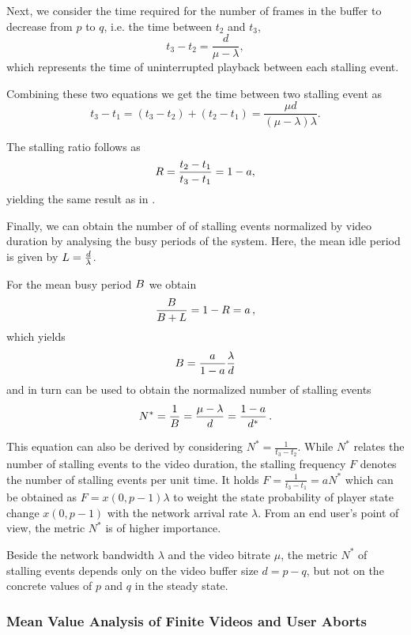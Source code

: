 Next, we consider the time required for the number of frames in the buffer to decrease from \(p\) 
to \(q\), i.e. the time between \(t_2\) and \(t_3\), 
\[t_3-t_2 = \frac{d}{\mu-\lambda},\]
which represents the time of uninterrupted playback between each stalling event.

Combining these two equations we get the time between two stalling event as
\[
t_3-t_1=(t_3-t_2)+(t_2-t_1)=\frac{\mu d}{(\mu-\lambda)\lambda}.
\]

The stalling ratio \stallingRatio follows as
\begin{equation}
R = \frac{t_2-t_1}{t_3-t_1} = 1-a,
\label{eq:application:qoe_user_behaviour:system_model:steady_state:stalling_ratio}
\end{equation}
yielding the same result as in .

Finally, we can obtain the number of of stalling events normalized by video duration by analysing the busy periods of the system.
Here, the mean idle period is given by \(L = \frac{d}{\lambda}\).

For the mean busy period \(B\) we obtain
\[
\frac{B}{B + L} = 1 - R = a \, ,
\]
which yields
\[
B = \frac{a}{1-a}\frac{\lambda}{d} 
\]
and in turn can be used to obtain the normalized number of stalling events 
\begin{equation}
N^* = \frac{1}{B}=\frac{\mu-\lambda}{d} = \frac{1-a}{d^*}\, .
\label{eq:application:qoe_user_behaviour:system_model:steady_state:normalized_number_of_stalling events}
\end{equation}

This equation can also be derived by considering \(N^*=\frac{1}{t_3-t_2}\). 
While \(N^*\) relates the number of stalling events to the video duration, the stalling frequency \(F\) denotes the number of stalling events per unit time. 
It holds \(F=\frac{1}{t_3-t_1}=a N^*\) which can be obtained as \(F=x(0,p-1) \lambda\) to weight the state probability of player state change \(x(0,p-1)\) with the network arrival rate \(\lambda\). 
From an end user's point of view, the metric $N^*$ is of higher importance. 

Beside the network bandwidth \(\lambda\) and the video bitrate \(\mu\), the metric \(N^*\) of stalling events depends only on the video buffer size \(d=p-q\), but not on the concrete values of \(p\) and \(q\) in the steady state.


\subsubsection*{Mean Value Analysis of Finite Videos and User Aborts}\label{sec:application:qoe_user_behaviour:system_model:finite_video}

